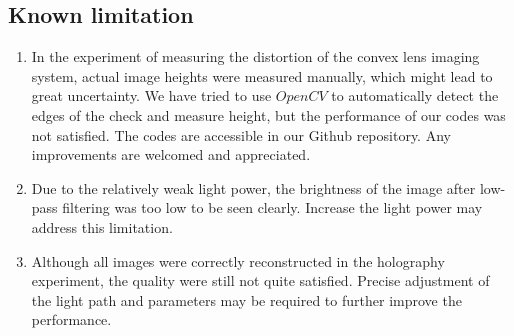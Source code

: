 \documentclass[10pt,a4paper,twocolumn,twoside,UTF8]{article}
\begin{document}
	\subsection{Known limitation}
		\begin{enumerate}[label=\arabic*.]
			\item In the experiment of measuring the distortion of the convex lens imaging system, actual image heights were measured manually, which might lead to great uncertainty. 
				  We have tried to use $OpenCV$ to automatically detect the edges of the check and measure height, but the performance of our codes was not satisfied.
				  The codes are accessible in our Github repository. Any improvements are welcomed and appreciated.
			\item Due to the relatively weak light power, the brightness of the image after low-pass filtering was too low to be seen clearly. Increase the light power may address this limitation.
			\item Although all images were correctly reconstructed in the holography experiment, the quality were still not quite satisfied. 
				  Precise adjustment of the light path and parameters may be required to further improve the performance.
		\end{enumerate}



\printbibliography[title=Reference] 
\end{document}
